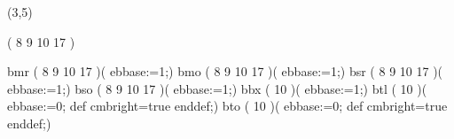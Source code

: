 %
%
%
%
%
%
%

\lhvercheck(3,5)

%
\MakeFileHeadstrue %
     \tablevalues                   ( 8 9 10 17 )

     \makefont \fonttwoletters bmr  ( 8 9 10 17 )(%
                                                ebbase:=1;)
     \makefont \fonttwoletters bmo  ( 8 9 10 17 )(%
                                                ebbase:=1;)
     \makefont \fonttwoletters bsr  ( 8 9 10 17 )(%
                                                ebbase:=1;)
     \makefont \fonttwoletters bso  ( 8 9 10 17 )(%
                                                ebbase:=1;)
     \makefont \fonttwoletters bbx  (     10    )(%
                                                ebbase:=1;)
     \makefont \fonttwoletters btl  (     10    )(%
                                                ebbase:=0; def cmbright=true enddef;)
     \makefont \fonttwoletters bto  (     10    )(%
                                                ebbase:=0; def cmbright=true enddef;)
\endinput
